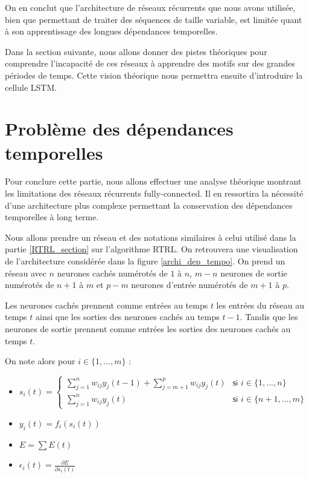 On en conclut que l'architecture de réseaux récurrents que nous avons utilisée, bien que permettant de traiter des séquences de taille variable, est limitée quant à son apprentissage des longues dépendances temporelles.

Dans la section suivante, nous allons donner des pistes théoriques pour comprendre l'incapacité de ces réseaux à apprendre des motifs sur des grandes périodes de temps. Cette vision théorique nous permettra ensuite d'introduire la cellule LSTM.

\section{Problème des dépendances temporelles}

\label{dependances_temporelles}

Pour conclure cette partie, nous allons effectuer une analyse théorique montrant les limitations des réseaux récurrents fully-connected. Il en ressortira la nécessité d'une architecture plus complexe permettant la conservation des dépendances temporelles à long terme.

Nous allons prendre un réseau et des notations similaires à celui utilisé dans la partie \ref{RTRL_section} sur l'algorithme RTRL. On retrouvera une visualisation de l'architecture considérée dans la figure \ref{archi_dep_tempo}. On prend un réseau avec $n$ neurones cachés numérotés de $1$ à $n$, $m - n$ neurones de sortie numérotés de $n+1$ à $m$ et $p - m$ neurones d'entrée numérotés de $m+1$ à $p$.

Les neurones cachés prennent comme entrées au temps $t$ les entrées du réseau au temps $t$ ainsi que les sorties des neurones cachés au temps $t-1$. Tandis que les neurones de sortie prennent comme entrées les sorties des neurones cachés au temps $t$.

On note alors pour $i \in \{1, ..., m\}$ :
\begin{itemize}
	\item $s_i(t) = \left\{
    \begin{array}{ll}
        \sum_{j = 1}^{n}{w_{ij}y_j(t-1)} + \sum_{j = m+1}^{p}{w_{ij}y_j(t)} & \textsf{si } i \in \{1, ..., n\} \\
        \sum_{j = 1}^{n}{w_{ij}y_j(t)} & \textsf{si } i \in \{n+1, ..., m\}
    \end{array}
\right.$
	\item $y_i(t) = f_i(s_i(t))$
	\item $E = \sum{E(t)}$
	\item $\epsilon_i(t) = \frac{\partial E}{\partial s_i(t)}$
\end{itemize}


